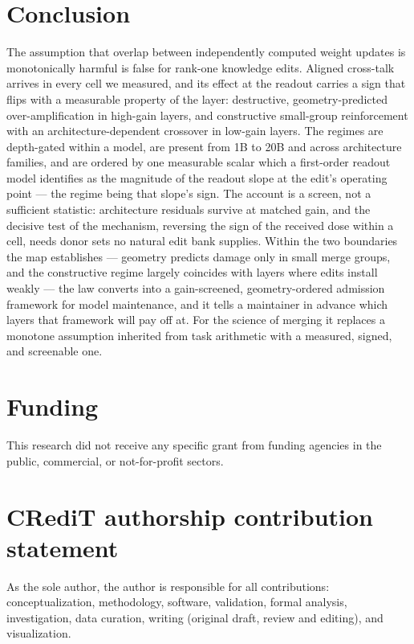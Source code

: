 \documentclass[preprint,12pt]{elsarticle}
\theoremstyle{definition}
\begin{document}
\section{Conclusion}\label{sec:conclusion}
The assumption that overlap between independently computed weight updates is
monotonically harmful is false for rank-one knowledge edits. Aligned cross-talk arrives
in every cell we measured, and its effect at the readout carries a sign that flips with a
measurable property of the layer: destructive, geometry-predicted over-amplification in
high-gain layers, and constructive small-group reinforcement with an
architecture-dependent crossover in low-gain layers. The regimes are depth-gated within
a model, are present from 1B to 20B and across \nFamilies{} architecture families, and
are ordered by one measurable scalar which a first-order readout model identifies as the
magnitude of the readout slope at the edit's operating point --- the regime being that
slope's sign. The account is a screen, not a sufficient statistic: architecture residuals
survive at matched gain, and the decisive test of the mechanism, reversing the sign of
the received dose within a cell, needs donor sets no natural edit bank supplies. Within
the two boundaries the map establishes --- geometry predicts damage only in small merge
groups, and the constructive regime largely coincides with layers where edits install
weakly --- the law converts into a gain-screened, geometry-ordered admission framework
for model maintenance, and it tells a maintainer in advance which layers that framework
will pay off at. For the science of merging it replaces a monotone assumption inherited
from task arithmetic with a measured, signed, and screenable one.

\section*{Funding}
This research did not receive any specific grant from funding agencies in the public,
commercial, or not-for-profit sectors.

\section*{CRediT authorship contribution statement}
As the sole author, the author is responsible for all contributions: conceptualization,
methodology, software, validation, formal analysis, investigation, data curation, writing
(original draft, review and editing), and visualization.
\end{document}
